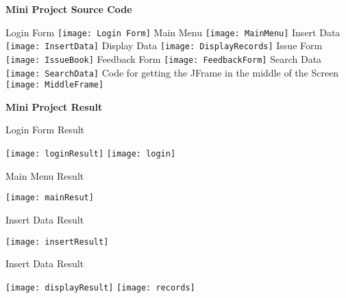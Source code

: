 \documentclass{article}
\begin{document}
\begin{center}
\textbf{Mini Project Source Code}\newline\newline
\end{center}
\Large
Login Form\newline\newline
\texttt{[image: Login Form]}
\newpage
Main Menu\newline\newline
\texttt{[image: MainMenu]}
\newpage
Insert Data\newline
\texttt{[image: InsertData]}
Display Data\newline
\texttt{[image: DisplayRecords]}
\newpage
Issue Form\newline\newline
\texttt{[image: IssueBook]}
Feedback Form\newline\newline
\texttt{[image: FeedbackForm]}
\newpage
Search Data\newline\newline
\texttt{[image: SearchData]}
Code for getting the JFrame in the middle of the Screen\newline\newline
\texttt{[image: MiddleFrame]}
\newpage
\begin{center}
\LARGE
\textbf{Mini Project Result}\newline
\end{center}
\Large
Login Form Result\newline
\begin{center}
\texttt{[image: loginResult]}\newline\newline
\texttt{[image: login]}
\end{center}
\newpage
Main Menu Result
\begin{center}
\texttt{[image: mainResut]}
\end{center}
Insert Data Result
\begin{center}
\texttt{[image: insertResult]}
\end{center}
\newpage
Insert Data Result\newline
\begin{center}
\texttt{[image: displayResult]}\newline\newline
\texttt{[image: records]}
\end{center}
\end{document}
